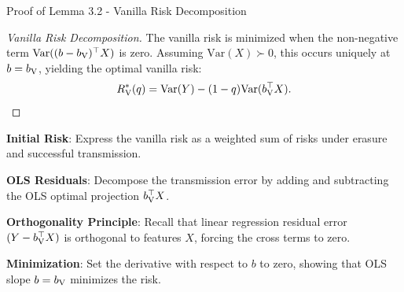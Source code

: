 \begin{sourceblock}{Proof of Lemma 3.2 - Vanilla Risk Decomposition}
\begin{proof}[Vanilla Risk Decomposition]
The vanilla risk is minimized when the non-negative term $\mathrm{Var}((b - b_{\mathrm{V}})^\top X)$ is zero. Assuming $\mathrm{Var}(X) \succ 0$, this occurs uniquely at $b = b_{\mathrm{V}}$, yielding the optimal vanilla risk:
\begin{equation}
    R_{\mathrm{V}}^*(q) = \mathrm{Var}(Y) - (1 - q)\mathrm{Var}(b_{\mathrm{V}}^\top X).
\end{equation}
\end{proof}
\end{sourceblock}

\begin{guideblock}
\item \textbf{Initial Risk}: Express the vanilla risk as a weighted sum of risks under erasure and successful transmission.
\item \textbf{OLS Residuals}: Decompose the transmission error by adding and subtracting the OLS optimal projection $b_{\mathrm{V}}^\top X$.
\item \textbf{Orthogonality Principle}: Recall that linear regression residual error $(Y - b_{\mathrm{V}}^\top X)$ is orthogonal to features $X$, forcing the cross terms to zero.
\item \textbf{Minimization}: Set the derivative with respect to $b$ to zero, showing that OLS slope $b = b_{\mathrm{V}}$ minimizes the risk.
\end{guideblock}


